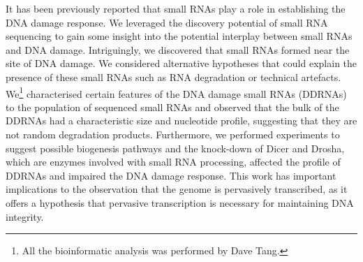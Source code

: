 It has been previously reported that small RNAs play a role in establishing the DNA damage response\cite{pmid19444217}. We leveraged the discovery potential of small RNA sequencing to gain some insight into the potential interplay between small RNAs and DNA damage. Intriguingly, we discovered that small RNAs formed near the site of DNA damage. We considered alternative hypotheses that could explain the presence of these small RNAs such as RNA degradation or technical artefacts. We\footnote{All the bioinformatic analysis was performed by Dave Tang.} characterised certain features of the DNA damage small RNAs (DDRNAs) to the population of sequenced small RNAs and observed that the bulk of the DDRNAs had a characteristic size and nucleotide profile, suggesting that they are not random degradation products. Furthermore, we performed experiments to suggest possible biogenesis pathways and the knock-down of Dicer and Drosha, which are enzymes involved with small RNA processing, affected the profile of DDRNAs and impaired the DNA damage response. This work has important implications to the observation that the genome is pervasively transcribed, as it offers a hypothesis that pervasive transcription is necessary for maintaining DNA integrity.
